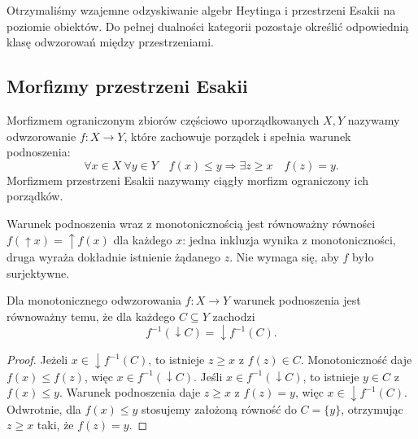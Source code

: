 Otrzymaliśmy wzajemne odzyskiwanie algebr Heytinga
i przestrzeni Esakii na poziomie obiektów.
Do pełnej dualności kategorii pozostaje określić
odpowiednią klasę odwzorowań między przestrzeniami.

\subsection{Morfizmy przestrzeni Esakii}

\begin{definicja}
\label{def:ncl-heyting-esakia-morphism}
Morfizmem ograniczonym zbiorów częściowo
uporządkowanych $X,Y$ nazywamy odwzorowanie
$f:X\to Y$, które zachowuje porządek i spełnia
warunek podnoszenia:
\[
 \forall x\in X\ \forall y\in Y\quad
 f(x)\leq y\Longrightarrow
 \exists z\geq x\quad f(z)=y.
\]
Morfizmem przestrzeni Esakii nazywamy ciągły
morfizm ograniczony ich porządków.
\end{definicja}
Warunek podnoszenia wraz z monotonicznością
jest równoważny równości
$f(\uparrow x)=\uparrow f(x)$ dla każdego $x$:
jedna inkluzja wynika z monotoniczności, druga
wyraża dokładnie istnienie żądanego $z$.
Nie wymaga się, aby $f$ było surjektywne.

\begin{lemat}
\label{lem:ncl-heyting-bounded-preimage}
Dla monotonicznego odwzorowania $f:X\to Y$
warunek podnoszenia jest równoważny temu, że
dla każdego $C\subseteq Y$ zachodzi
\[
 f^{-1}(\downarrow C)=\downarrow f^{-1}(C).
\]
\end{lemat}
\begin{proof}
Jeżeli $x\in\downarrow f^{-1}(C)$, to istnieje
$z\geq x$ z $f(z)\in C$. Monotoniczność daje
$f(x)\leq f(z)$, więc $x\in f^{-1}(\downarrow C)$.
Jeśli $x\in f^{-1}(\downarrow C)$, to istnieje
$y\in C$ z $f(x)\leq y$.
Warunek podnoszenia daje $z\geq x$ z $f(z)=y$,
więc $x\in\downarrow f^{-1}(C)$.
Odwrotnie, dla $f(x)\leq y$ stosujemy założoną
równość do $C=\{y\}$, otrzymując
$z\geq x$ taki, że $f(z)=y$.
\end{proof}

